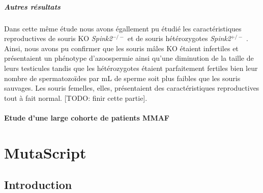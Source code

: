 \documentclass[12pt,twoside]{reedthesis}
\theoremstyle{definition}
\theoremstyle{definition}
\theoremstyle{remark}
\begin{document}
  \paragraph{Autres résultats}\label{autres-resultats-1}
  
  Dans cette même étude nous avons égallement pu étudié les
  caractéristiques reproductives de souris KO \emph{Spink2}\(^{-/-}\) et
  de souris hétérozygotes \emph{Spink2}\(^{+/-}\) . Ainsi, nous avons pu
  confirmer que les souris mâles KO étaient infertiles et présentaient un
  phénotype d'azoospermie ainsi qu'une diminution de la taille de leurs
  testicules tandis que les hétérozygotes étaient parfaitement fertiles
  bien leur nombre de spermatozoïdes par mL de sperme soit plus faibles
  que les souris sauvages. Les souris femelles, elles, présentaient des
  caractéristiques reproductives tout à fait normal. {[}TODO: finir cette
  partie{]}.
  
  \newpage  
  
  \hypertarget{cohortemmah}{\subsubsection{Etude d'une large cohorte de
  patients MMAF}\label{cohortemmah}}
  
  \chapter{MutaScript}\label{mutascript}
  
  \section{Introduction}\label{introduction}
  
\end{document}
